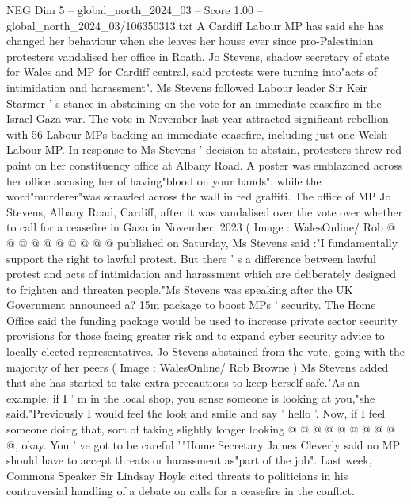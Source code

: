 \begin{textsample}{NEG Dim 5 – global\_north\_2024\_03 – Score 1.00 – global\_north\_2024\_03/106350313.txt}  \label{ex:f5_neg_087}
A Cardiff Labour MP has said she has changed her behaviour when she leaves her house ever since pro-Palestinian protesters vandalised her office in Roath.
Jo Stevens, shadow secretary of state for Wales and MP for Cardiff central, said protests were turning into"acts of intimidation and harassment".
Ms Stevens followed Labour leader Sir Keir Starmer ' s stance in abstaining on the vote for an immediate ceasefire in the Israel-Gaza war.
The vote in November last year attracted significant rebellion with 56 Labour MPs backing an immediate ceasefire, including just one Welsh Labour MP.
In response to Ms Stevens ' decision to abstain, protesters threw red paint on her constituency office at Albany Road.
A poster was emblazoned across her office accusing her of having"blood on your hands", while the word"murderer"was scrawled across the wall in red graffiti.
The office of MP Jo Stevens, Albany Road, Cardiff, after it was vandalised over the vote over whether to call for a ceasefire in Gaza in November, 2023 ( Image : WalesOnline/ Rob @ @ @ @ @ @ @ @ @ @ published on Saturday, Ms Stevens said :"I fundamentally support the right to lawful protest.
But there ' s a difference between lawful protest and acts of intimidation and harassment which are deliberately designed to frighten and threaten people."Ms Stevens was speaking after the UK Government announced a? 15m package to boost MPs ' security.
The Home Office said the funding package would be used to increase private sector security provisions for those facing greater risk and to expand cyber security advice to locally elected representatives.
Jo Stevens abstained from the vote, going with the majority of her peers ( Image : WalesOnline/ Rob Browne ) Ms Stevens added that she has started to take extra precautions to keep herself safe."As an example, if I ' m in the local shop, you sense someone is looking at you,"she said."Previously I would feel the look and smile and say ' hello '.
Now, if I feel someone doing that, sort of taking slightly longer looking @ @ @ @ @ @ @ @ @ @, okay.
You ' ve got to be careful '."Home Secretary James Cleverly said no MP should have to accept threats or harassment as"part of the job".
Last week, Commons Speaker Sir Lindsay Hoyle cited threats to politicians in his controversial handling of a debate on calls for a ceasefire in the conflict.

\end{textsample}
